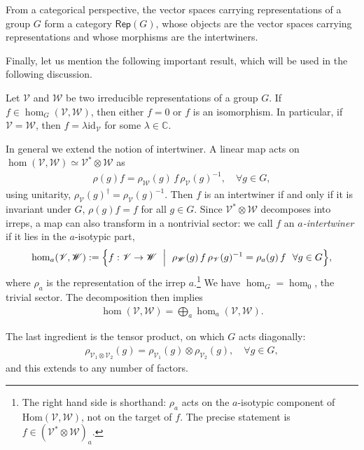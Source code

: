 From a categorical perspective, the vector spaces carrying representations of a group $G$ form a category $\mathsf{Rep}(G)$, whose objects are the vector spaces carrying representations and whose morphisms are the intertwiners. 

Finally, let us mention the following important result, which will be used in the following discussion.
\begin{theorem}
    Let $\mathscr{V}$ and $\mathscr{W}$ be two irreducible representations of a group $G$. If $f\in\hom_G(\mathscr{V},\mathscr{W})$, then either $f=0$ or $f$ is an isomorphism. In particular, if $\mathscr{V}=\mathscr{W}$, then $f = \lambda \mathrm{id}_\mathscr{V}$ for some $\lambda\in \mathbb{C}$.
\end{theorem}

In general we extend the notion of intertwiner. A linear map acts on $\hom(\mathscr{V},\mathscr{W})\simeq \mathscr{V}^*\otimes \mathscr{W}$ as\begin{align*}
    \rho(g)f = \rho_\mathscr{W}(g)\,f\,\rho_\mathscr{V}(g)^{-1},\quad \forall g\in G,
\end{align*}
using unitarity, $\rho_\mathscr{V}(g)^\dagger=\rho_\mathscr{V}(g)^{-1}$. Then $f$ is an intertwiner if and only if it is invariant under $G$, $\rho(g)f = f$ for all $g\in G$. Since $\mathscr{V}^*\otimes \mathscr{W}$ decomposes into irreps, a map can also transform in a nontrivial sector: we call $f$ an \emph{$a$-intertwiner} if it lies in the $a$-isotypic part,\begin{align*}
    \hom_a(\mathscr V,\mathscr W):=\Bigl\{f:\mathscr V\to\mathscr W\  \Bigm|\ \rho_{\mathscr
W}(g)\,f\,\rho_{\mathscr V}(g)^{-1}=\rho_a(g)\,f\ \ \forall g\in G\Bigr\},
\end{align*}
where $\rho_a$ is the representation of the irrep $a$.\footnote{The right hand side is shorthand: $\rho_a$ acts on the $a$-isotypic component of $\mathrm{Hom}(\mathscr V,\mathscr W)$, not on the target of $f$. The precise statement is $f\in(\mathscr V^*\otimes\mathscr W)_a$.} We have $\hom_G = \hom_0$, the trivial sector. The decomposition then implies\begin{align*}
    \hom(\mathscr V,\mathscr W) = \bigoplus_a \hom_a(\mathscr V,\mathscr W).
\end{align*}

The last ingredient is the tensor product, on which $G$ acts diagonally:\begin{align}
    \rho_{\mathscr{V}_1\otimes\mathscr{V}_2}(g) = \rho_{\mathscr{V}_1}(g)\otimes \rho_{\mathscr{V}_2}(g),\quad \forall g\in G,
\end{align}
and this extends to any number of factors. 

